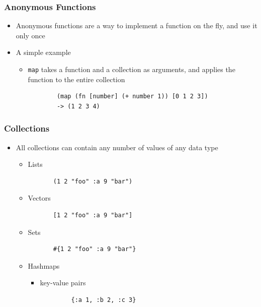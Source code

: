 \documentclass{beamer}
\begin{document}
\begin{frame}[fragile]
\frametitle{Anonymous Functions}
	\begin{itemize}
  	 \item Anonymous functions are a way to implement a function on the fly, and use it only once\
  	 \item A simple example
  	 \begin{itemize}
  	 	\item \texttt{map} takes a function and a collection as arguments, and applies the function to the entire collection
  	 	\begin{verbatim}
		(map (fn [number] (+ number 1)) [0 1 2 3])
		-> (1 2 3 4)
	\end{verbatim}
	\end{itemize}
	\end{itemize}
\end{frame}

\begin{frame}[fragile]
\frametitle{Collections}
    \begin{itemize}
     \item All collections can contain any number of values of any data type
	 \begin{itemize}
	  \item Lists
	  \begin{verbatim}
	   (1 2 "foo" :a 9 "bar")
	  \end{verbatim}
  	  \item Vectors
  	  \begin{verbatim}
	   [1 2 "foo" :a 9 "bar"]
	  \end{verbatim}
  	  \item Sets
  	  \begin{verbatim}
	   #{1 2 "foo" :a 9 "bar"}
	  \end{verbatim}
  	  \item Hashmaps
  	  \begin{itemize}
  	 	 \item key-value pairs
  	  \end{itemize}
  	  \begin{verbatim}
	    	{:a 1, :b 2, :c 3}
	  \end{verbatim}
	 \end{itemize}
    \end{itemize}
\end{frame}
\end{document}

